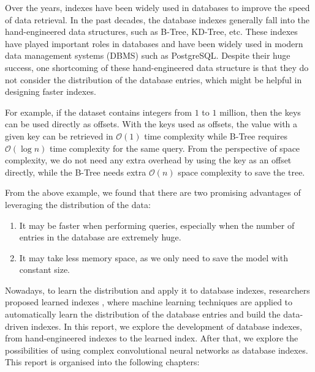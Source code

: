 Over the years, indexes have been widely used in databases to improve the speed of data retrieval. In the past decades, the database indexes generally fall into the hand-engineered data structures, such as B-Tree, KD-Tree, etc. These indexes have played important roles in databases and have been widely used in modern data management systems (DBMS) such as PostgreSQL. Despite their huge success, one shortcoming of these hand-engineered data structure is that they do not consider the distribution of the database entries, which might be helpful in designing faster indexes.

\begin{mscexample}
	For example, if the dataset contains integers from $1$ to $1$ million, then the keys can be used directly as offsets. With the keys used as offsets, the value with a given key can be retrieved in $\mathcal{O}(1)$ time complexity while B-Tree requires $\mathcal{O}(\log n)$ time complexity for the same query. From the perspective of space complexity, we do not need any extra overhead by using the key as an offset directly, while the B-Tree needs extra $\mathcal{O}(n)$ space complexity to save the tree.
\end{mscexample}

From the above example, we found that there are two promising advantages of leveraging the distribution of the data:
\begin{enumerate}
  \item It may be faster when performing queries, especially when the number of entries in the database are extremely huge.
  \item It may take less memory space, as we only need to save the model with constant size.
  \end{enumerate}

Nowadays, to learn the distribution and apply it to database indexes, researchers proposed learned indexes \cite{kraska2018case}, where machine learning techniques are applied to automatically learn the distribution of the database entries and build the data-driven indexes. In this report, we explore the development of database indexes, from hand-engineered indexes to the learned index. After that, we explore the possibilities of using complex convolutional neural networks as database indexes. This report is organised into the following chapters:


